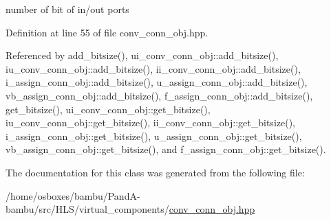 number of bit of in/out ports 



Definition at line 55 of file conv\+\_\+conn\+\_\+obj.\+hpp.



Referenced by add\+\_\+bitsize(), ui\+\_\+conv\+\_\+conn\+\_\+obj\+::add\+\_\+bitsize(), iu\+\_\+conv\+\_\+conn\+\_\+obj\+::add\+\_\+bitsize(), ii\+\_\+conv\+\_\+conn\+\_\+obj\+::add\+\_\+bitsize(), i\+\_\+assign\+\_\+conn\+\_\+obj\+::add\+\_\+bitsize(), u\+\_\+assign\+\_\+conn\+\_\+obj\+::add\+\_\+bitsize(), vb\+\_\+assign\+\_\+conn\+\_\+obj\+::add\+\_\+bitsize(), f\+\_\+assign\+\_\+conn\+\_\+obj\+::add\+\_\+bitsize(), get\+\_\+bitsize(), ui\+\_\+conv\+\_\+conn\+\_\+obj\+::get\+\_\+bitsize(), iu\+\_\+conv\+\_\+conn\+\_\+obj\+::get\+\_\+bitsize(), ii\+\_\+conv\+\_\+conn\+\_\+obj\+::get\+\_\+bitsize(), i\+\_\+assign\+\_\+conn\+\_\+obj\+::get\+\_\+bitsize(), u\+\_\+assign\+\_\+conn\+\_\+obj\+::get\+\_\+bitsize(), vb\+\_\+assign\+\_\+conn\+\_\+obj\+::get\+\_\+bitsize(), and f\+\_\+assign\+\_\+conn\+\_\+obj\+::get\+\_\+bitsize().



The documentation for this class was generated from the following file\+:\begin{DoxyCompactItemize}
\item 
/home/osboxes/bambu/\+Pand\+A-\/bambu/src/\+H\+L\+S/virtual\+\_\+components/\hyperlink{conv__conn__obj_8hpp}{conv\+\_\+conn\+\_\+obj.\+hpp}\end{DoxyCompactItemize}
